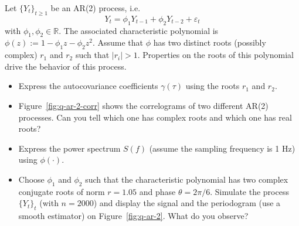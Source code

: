 \documentclass[11pt]{article}
\begin{document}
\newpage
\begin{exercise}[subtitle=AR(2) process]
Let $\{Y_t\}_{t\geq 1}$ be an AR(2) process, i.e.
\begin{equation}
    Y_t = \phi_1 Y_{t-1} + \phi_2 Y_{t-2} + \varepsilon_t
\end{equation}
with $\phi_1, \phi_2\in\mathbb{R}$.
The associated characteristic polynomial is $\phi(z):=1-\phi_1 z - \phi_2 z^2$.
Assume that $\phi$ has two distinct roots (possibly complex) $r_1$ and $r_2$ such that $|r_i|>1$.
Properties on the roots of this polynomial drive the behavior of this process.


\begin{itemize}
    \item Express the autocovariance coefficients $\gamma(\tau)$ using the roots $r_1$ and $r_2$.
    \item Figure~\ref{fig:q-ar-2-corr} shows the correlograms of two different AR(2) processes. Can you tell which one has complex roots and which one has real roots?
    \item Express the power spectrum $S(f)$ (assume the sampling frequency is 1 Hz) using $\phi(\cdot)$.
    \item Choose $\phi_1$ and $\phi_2$ such that the characteristic polynomial has two complex conjugate roots of norm $r=1.05$ and phase $\theta=2\pi/6$. Simulate the process $\{Y_t\}_t$ (with $n=2000$) and display the signal and the periodogram (use a smooth estimator) on Figure~\ref{fig:q-ar-2}. What do you observe?
\end{itemize}



\end{exercise}
\end{document}
